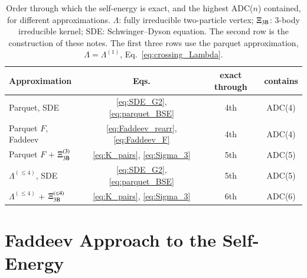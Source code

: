 \documentclass[aip,jcp,reprint,noshowkeys,superscriptaddress]{revtex4-1}
\begin{document}
\begin{table}[hbt!]
\caption{Order through which the self-energy is exact, and the highest
ADC($n$) contained, for different approximations. $\Lambda$: fully
irreducible two-particle vertex; $\Xi_{\rm 3B}$: 3-body irreducible
kernel; SDE: Schwinger--Dyson equation. The second row is the
construction of these notes. The first three rows use the parquet
approximation,
$\Lambda=\Lambda^{(1)}$, Eq.~\eqref{eq:crossing_Lambda}.}
\label{tab:orders}
\begin{ruledtabular}
\begin{tabular}{lccc}
Approximation & Eqs. & exact through & contains \\
\hline
Parquet, SDE
& \eqref{eq:SDE_G2}, \eqref{eq:parquet_BSE} & 4th & ADC(4) \\
Parquet $F$, Faddeev
& \eqref{eq:Faddeev_rearr}, \eqref{eq:Faddeev_F} & 4th & ADC(4) \\
Parquet $F$ $+$ $\Xi_{\rm 3B}^{(3)}$
& \eqref{eq:K_pairs}, \eqref{eq:Sigma_3} & 5th & ADC(5) \\
$\Lambda^{(\le4)}$, SDE
& \eqref{eq:SDE_G2}, \eqref{eq:parquet_BSE} & 5th & ADC(5) \\
$\Lambda^{(\le4)}$ $+$ $\Xi_{\rm 3B}^{(\le4)}$
& \eqref{eq:K_pairs}, \eqref{eq:Sigma_3} & 6th & ADC(6) \\
\end{tabular}
\end{ruledtabular}
\end{table}

\section{Faddeev Approach to the Self-Energy}
\end{document}
